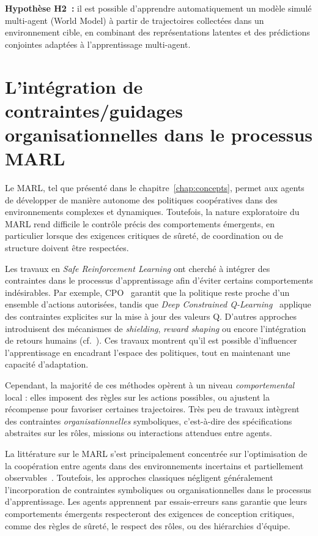 \medskip

\noindent
\textbf{Hypothèse H2~:} il est possible d'apprendre automatiquement un modèle simulé multi-agent (World Model) à partir de trajectoires collectées dans un environnement cible, en combinant des représentations latentes et des prédictions conjointes adaptées à l'apprentissage multi-agent.


\section{L'intégration de contraintes/guidages organisationnelles dans le processus MARL}

\noindent
Le \ac{MARL}, tel que présenté dans le chapitre~\autoref{chap:concepts}, permet aux agents de développer de manière autonome des politiques coopératives dans des environnements complexes et dynamiques. Toutefois, la nature exploratoire du \ac{MARL} rend difficile le contrôle précis des comportements émergents, en particulier lorsque des exigences critiques de sûreté, de coordination ou de structure doivent être respectées. 

\medskip

\noindent
Les travaux en \textit{Safe Reinforcement Learning} ont cherché à intégrer des contraintes dans le processus d'apprentissage afin d'éviter certains comportements indésirables. Par exemple, \ac{CPO}~\cite{achiam2017constrained} garantit que la politique reste proche d'un ensemble d'actions autorisées, tandis que \textit{Deep Constrained Q-Learning}~\cite{kalweit2020deep} applique des contraintes explicites sur la mise à jour des valeurs Q. D'autres approches introduisent des mécanismes de \textit{shielding}, \textit{reward shaping} ou encore l'intégration de retours humains (cf.~\cite{zhou2025mentor}). Ces travaux montrent qu'il est possible d'influencer l'apprentissage en encadrant l'espace des politiques, tout en maintenant une capacité d'adaptation.

\noindent
Cependant, la majorité de ces méthodes opèrent à un niveau \textit{comportemental} local : elles imposent des règles sur les actions possibles, ou ajustent la récompense pour favoriser certaines trajectoires. Très peu de travaux intègrent des contraintes \textit{organisationnelles} symboliques, c'est-à-dire des spécifications abstraites sur les rôles, missions ou interactions attendues entre agents.

\medskip

\noindent
La littérature sur le \ac{MARL} s'est principalement concentrée sur l'optimisation de la coopération entre agents dans des environnements incertains et partiellement observables~\cite{Zhang2021, Papoudakis2021}. Toutefois, les approches classiques négligent généralement l'incorporation de contraintes symboliques ou organisationnelles dans le processus d'apprentissage. Les agents apprennent par essais-erreurs sans garantie que leurs comportements émergents respecteront des exigences de conception critiques, comme des règles de sûreté, le respect des rôles, ou des hiérarchies d'équipe.

